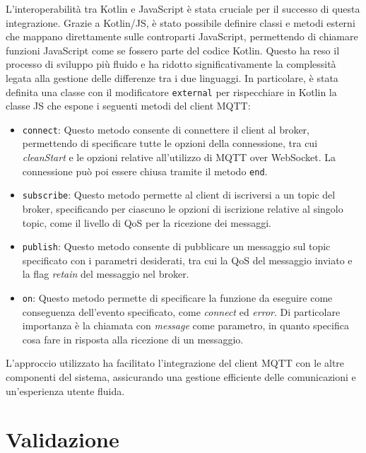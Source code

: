 \documentclass[12pt,a4paper,openright,twoside]{book}
\begin{document}
L'interoperabilità tra Kotlin e JavaScript è stata cruciale per il successo di questa integrazione. Grazie a Kotlin/JS, è stato possibile definire classi e metodi esterni 
che mappano direttamente sulle controparti JavaScript, permettendo di chiamare funzioni JavaScript come se fossero parte del codice Kotlin. Questo ha reso il processo di 
sviluppo più fluido e ha ridotto significativamente la complessità legata alla gestione delle differenze tra i due linguaggi. 
In particolare, è stata definita una classe con il modificatore \texttt{external} per rispecchiare in Kotlin la classe \ac{JS} che espone i seguenti metodi del client \ac{MQTT}:
\begin{itemize}
    \item \texttt{connect}: Questo metodo consente di connettere il client al broker, permettendo di specificare tutte le opzioni della connessione, 
    tra cui \textit{cleanStart} e le opzioni relative all'utilizzo di \ac{MQTT} over WebSocket. La connessione può poi essere chiusa tramite il metodo \texttt{end}.

    \item \texttt{subscribe}: Questo metodo permette al client di iscriversi a un topic del broker, specificando per ciascuno le opzioni di iscrizione relative al singolo topic, 
    come il livello di \ac{QoS} per la ricezione dei messaggi.

    \item \texttt{publish}: Questo metodo consente di pubblicare un messaggio sul topic specificato con i parametri desiderati, tra cui la \ac{QoS} del messaggio inviato 
    e la flag \textit{retain} del messaggio nel broker.

    \item \texttt{on}: Questo metodo permette di specificare la funzione da eseguire come conseguenza dell'evento specificato, come \textit{connect} ed \textit{error}. 
    Di particolare importanza è la chiamata con \textit{message} come parametro, in quanto specifica cosa fare in risposta alla ricezione di un messaggio.
\end{itemize}

L'approccio utilizzato ha facilitato l'integrazione del client \ac{MQTT} con le altre componenti del sistema, assicurando una gestione efficiente delle comunicazioni 
e un'esperienza utente fluida.

\pagebreak
\section{Validazione}
\end{document}
